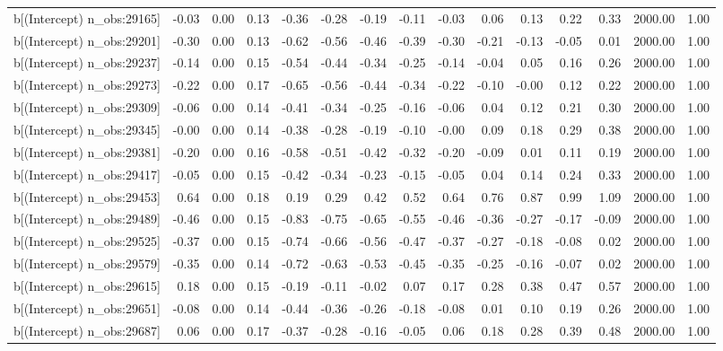 \begin{table}[ht]
\begin{tabular}{rrrrrrrrrrrrrrr}
  b[(Intercept) n\_obs:29165] & -0.03 & 0.00 & 0.13 & -0.36 & -0.28 & -0.19 & -0.11 & -0.03 & 0.06 & 0.13 & 0.22 & 0.33 & 2000.00 & 1.00 \\ 
  b[(Intercept) n\_obs:29201] & -0.30 & 0.00 & 0.13 & -0.62 & -0.56 & -0.46 & -0.39 & -0.30 & -0.21 & -0.13 & -0.05 & 0.01 & 2000.00 & 1.00 \\ 
  b[(Intercept) n\_obs:29237] & -0.14 & 0.00 & 0.15 & -0.54 & -0.44 & -0.34 & -0.25 & -0.14 & -0.04 & 0.05 & 0.16 & 0.26 & 2000.00 & 1.00 \\ 
  b[(Intercept) n\_obs:29273] & -0.22 & 0.00 & 0.17 & -0.65 & -0.56 & -0.44 & -0.34 & -0.22 & -0.10 & -0.00 & 0.12 & 0.22 & 2000.00 & 1.00 \\ 
  b[(Intercept) n\_obs:29309] & -0.06 & 0.00 & 0.14 & -0.41 & -0.34 & -0.25 & -0.16 & -0.06 & 0.04 & 0.12 & 0.21 & 0.30 & 2000.00 & 1.00 \\ 
  b[(Intercept) n\_obs:29345] & -0.00 & 0.00 & 0.14 & -0.38 & -0.28 & -0.19 & -0.10 & -0.00 & 0.09 & 0.18 & 0.29 & 0.38 & 2000.00 & 1.00 \\ 
  b[(Intercept) n\_obs:29381] & -0.20 & 0.00 & 0.16 & -0.58 & -0.51 & -0.42 & -0.32 & -0.20 & -0.09 & 0.01 & 0.11 & 0.19 & 2000.00 & 1.00 \\ 
  b[(Intercept) n\_obs:29417] & -0.05 & 0.00 & 0.15 & -0.42 & -0.34 & -0.23 & -0.15 & -0.05 & 0.04 & 0.14 & 0.24 & 0.33 & 2000.00 & 1.00 \\ 
  b[(Intercept) n\_obs:29453] & 0.64 & 0.00 & 0.18 & 0.19 & 0.29 & 0.42 & 0.52 & 0.64 & 0.76 & 0.87 & 0.99 & 1.09 & 2000.00 & 1.00 \\ 
  b[(Intercept) n\_obs:29489] & -0.46 & 0.00 & 0.15 & -0.83 & -0.75 & -0.65 & -0.55 & -0.46 & -0.36 & -0.27 & -0.17 & -0.09 & 2000.00 & 1.00 \\ 
  b[(Intercept) n\_obs:29525] & -0.37 & 0.00 & 0.15 & -0.74 & -0.66 & -0.56 & -0.47 & -0.37 & -0.27 & -0.18 & -0.08 & 0.02 & 2000.00 & 1.00 \\ 
  b[(Intercept) n\_obs:29579] & -0.35 & 0.00 & 0.14 & -0.72 & -0.63 & -0.53 & -0.45 & -0.35 & -0.25 & -0.16 & -0.07 & 0.02 & 2000.00 & 1.00 \\ 
  b[(Intercept) n\_obs:29615] & 0.18 & 0.00 & 0.15 & -0.19 & -0.11 & -0.02 & 0.07 & 0.17 & 0.28 & 0.38 & 0.47 & 0.57 & 2000.00 & 1.00 \\ 
  b[(Intercept) n\_obs:29651] & -0.08 & 0.00 & 0.14 & -0.44 & -0.36 & -0.26 & -0.18 & -0.08 & 0.01 & 0.10 & 0.19 & 0.26 & 2000.00 & 1.00 \\ 
  b[(Intercept) n\_obs:29687] & 0.06 & 0.00 & 0.17 & -0.37 & -0.28 & -0.16 & -0.05 & 0.06 & 0.18 & 0.28 & 0.39 & 0.48 & 2000.00 & 1.00 \\ 

\end{tabular}
\end{table}
